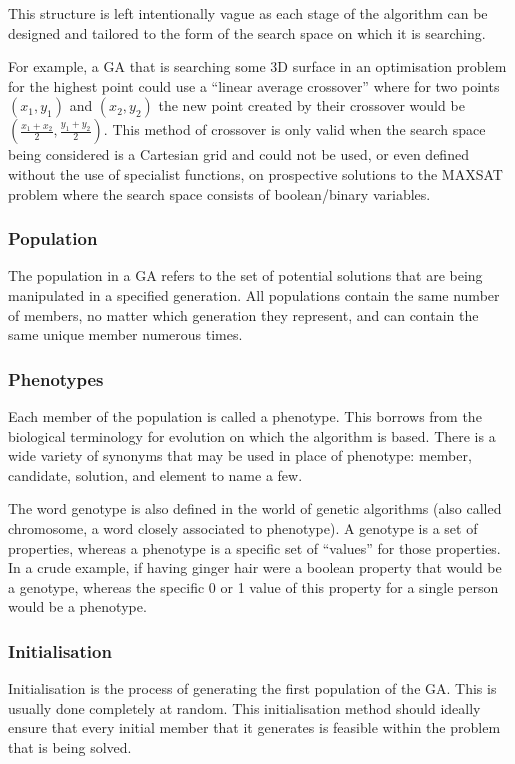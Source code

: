 This structure is left intentionally vague as each stage of the algorithm can be designed and tailored to the form of the search space on which it is searching. \newline

For example, a GA that is searching some 3D surface in an optimisation problem for the highest point could use a ``linear average crossover'' where for two points $(x_{1}, y_{1})$ and $(x_{2}, y_{2})$ the new point created by their crossover would be $(\frac{x_{1} + x_{2}}{2}, \frac{y_{1} + y_{2}}{2})$. This method of crossover is only valid when the search space being considered is a Cartesian grid and could not be used, or even defined without the use of specialist functions, on prospective solutions to the MAXSAT problem where the search space consists of boolean/binary variables.

\subsubsection{Population} \label{Population}
The population in a GA refers to the set of potential solutions that are being manipulated in a specified generation. All populations contain the same number of members, no matter which generation they represent, and can contain the same unique member numerous times.

\subsubsection{Phenotypes} \label{chromosome}
Each member of the population is called a phenotype. This borrows from the biological terminology for evolution on which the algorithm is based. There is a wide variety of synonyms that may be used in place of phenotype: member, candidate, solution, and element to name a few. \newline

The word genotype is also defined in the world of genetic algorithms (also called chromosome, a word closely associated to phenotype). A genotype is a set of properties, whereas a phenotype is a specific set of ``values'' for those properties. In a crude example, if having ginger hair were a boolean property that would be a genotype, whereas the specific 0 or 1 value of this property for a single person would be a phenotype.

\subsubsection{Initialisation} \label{Initialisation}
Initialisation is the process of generating the first population of the GA. This is usually done completely at random. This initialisation method should ideally ensure that every initial member that it generates is feasible within the problem that is being solved.

